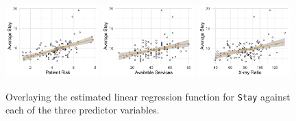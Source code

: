 \documentclass[10pt]{article}
\begin{document}
\begin{figure}[ht]
    \includegraphics[width = 0.32\textwidth]{img/q02-lm1.png}
    \includegraphics[width = 0.32\textwidth]{img/q02-lm2.png}
    \includegraphics[width = 0.32\textwidth]{img/q02-lm3.png}
    \caption{Overlaying the estimated linear regression function for \texttt{Stay} against each of the three predictor variables.}
    \label{q02-fig02}
\end{figure}
\end{document}
